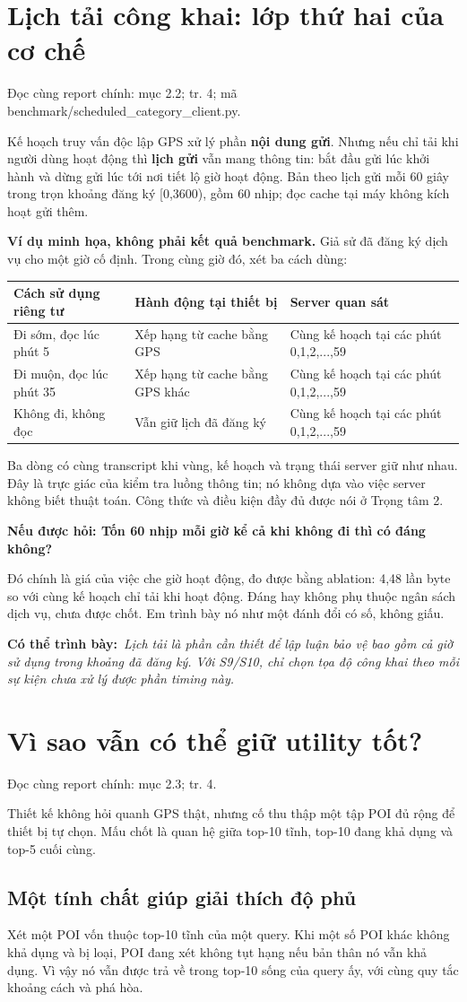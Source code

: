 \documentclass[10pt,a4paper]{article}
\newcommand{\say}[1]{\par\textbf{Có thể trình bày:}\ \textit{#1}\par}
\newcommand{\ask}[2]{\par\textbf{Nếu được hỏi: #1}\par #2\par}
\newcommand{\where}[1]{\par{\small\color{gray}Đọc cùng report chính: #1.}\par}
\newcommand{\example}{\textbf{Ví dụ minh họa, không phải kết quả benchmark.} }
\newcommand{\guidepage}[1]{\clearpage\section{#1}}
\begin{document}
\guidepage{Lịch tải công khai: lớp thứ hai của cơ chế}
\where{mục 2.2; tr. 4; mã benchmark/scheduled\_category\_client.py}
Kế hoạch truy vấn độc lập GPS xử lý phần \textbf{nội dung gửi}. Nhưng nếu chỉ tải khi người dùng hoạt động thì \textbf{lịch gửi} vẫn mang thông tin: bắt đầu gửi lúc khởi hành và dừng gửi lúc tới nơi tiết lộ giờ hoạt động. Bản theo lịch gửi mỗi 60 giây trong trọn khoảng đăng ký [0,3600), gồm 60 nhịp; đọc cache tại máy không kích hoạt gửi thêm.

\example Giả sử đã đăng ký dịch vụ cho một giờ cố định. Trong cùng giờ đó, xét ba cách dùng:
\begin{longtable}{@{}P{4.1cm}P{5.2cm}P{6.9cm}@{}}
\toprule Cách sử dụng riêng tư & Hành động tại thiết bị & Server quan sát\\\midrule
Đi sớm, đọc lúc phút 5 & Xếp hạng từ cache bằng GPS & Cùng kế hoạch tại các phút 0,1,2,...,59\\[3pt]
Đi muộn, đọc lúc phút 35 & Xếp hạng từ cache bằng GPS khác & Cùng kế hoạch tại các phút 0,1,2,...,59\\[3pt]
Không đi, không đọc & Vẫn giữ lịch đã đăng ký & Cùng kế hoạch tại các phút 0,1,2,...,59\\
\bottomrule
\end{longtable}
Ba dòng có cùng transcript khi vùng, kế hoạch và trạng thái server giữ như nhau. Đây là trực giác của kiểm tra luồng thông tin; nó không dựa vào việc server không biết thuật toán. Công thức và điều kiện đầy đủ được nói ở Trọng tâm 2.

\ask{Tốn 60 nhịp mỗi giờ kể cả khi không đi thì có đáng không?}{Đó chính là giá của việc che giờ hoạt động, đo được bằng ablation: 4,48 lần byte so với cùng kế hoạch chỉ tải khi hoạt động. Đáng hay không phụ thuộc ngân sách dịch vụ, chưa được chốt. Em trình bày nó như một đánh đổi có số, không giấu.}
\say{Lịch tải là phần cần thiết để lập luận bảo vệ bao gồm cả giờ sử dụng trong khoảng đã đăng ký. Với S9/S10, chỉ chọn tọa độ công khai theo mỗi sự kiện chưa xử lý được phần timing này.}

\guidepage{Vì sao vẫn có thể giữ utility tốt?}
\where{mục 2.3; tr. 4}
Thiết kế không hỏi quanh GPS thật, nhưng cố thu thập một tập POI đủ rộng để thiết bị tự chọn. Mấu chốt là quan hệ giữa top-10 tĩnh, top-10 đang khả dụng và top-5 cuối cùng.

\subsection*{Một tính chất giúp giải thích độ phủ}
Xét một POI vốn thuộc top-10 tĩnh của một query. Khi một số POI khác không khả dụng và bị loại, POI đang xét không tụt hạng nếu bản thân nó vẫn khả dụng. Vì vậy nó vẫn được trả về trong top-10 sống của query ấy, với cùng quy tắc khoảng cách và phá hòa.
\end{document}
